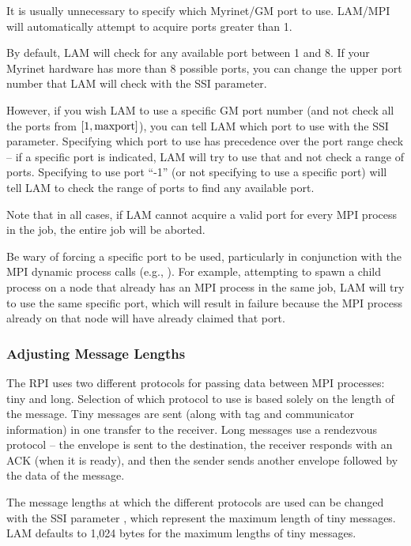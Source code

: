 It is usually unnecessary to specify which Myrinet/GM port to use.
LAM/MPI will automatically attempt to acquire ports greater than 1.

By default, LAM will check for any available port between 1 and 8.  If
your Myrinet hardware has more than 8 possible ports, you can change
the upper port number that LAM will check with the
 SSI parameter.

However, if you wish LAM to use a specific GM port number (and not
check all the ports from $[1, {\rm maxport}]$), you can tell LAM which
port to use with the  SSI parameter.
%
Specifying which port to use has precedence over the port range check
-- if a specific port is indicated, LAM will try to use that and not
check a range of ports.  Specifying to use port ``-1'' (or not
specifying to use a specific port) will tell LAM to check the range of
ports to find any available port.

Note that in all cases, if LAM cannot acquire a valid port for every
MPI process in the job, the entire job will be aborted.

Be wary of forcing a specific port to be used, particularly in
conjunction with the MPI dynamic process calls (e.g.,
).  For example, attempting to spawn a
child process on a node that already has an MPI process in the same
job, LAM will try to use the same specific port, which will result in
failure because the MPI process already on that node will have already
claimed that port.


\subsubsection{Adjusting Message Lengths}

The  RPI uses two different protocols for passing data between
MPI processes: tiny and long.  Selection of which protocol to use is
based solely on the length of the message.  Tiny messages are sent
(along with tag and communicator information) in one transfer to the
receiver.  Long messages use a rendezvous protocol -- the envelope is
sent to the destination, the receiver responds with an ACK (when it is
ready), and then the sender sends another envelope followed by the
data of the message.

The message lengths at which the different protocols are used can be
changed with the SSI parameter  ,
which represent the maximum length of tiny messages.  LAM defaults to
1,024 bytes for the maximum lengths of tiny messages.

